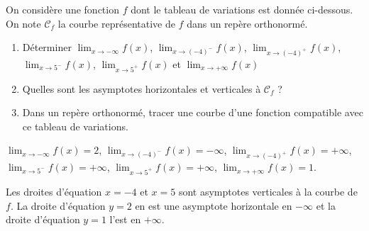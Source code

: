 \documentclass[11pt,fleqn, openany]{book} %
\begin{document}
\begin{exercise}[topic=lim21]On considère une fonction $f$ dont le tableau de variations est donnée ci-dessous. On note $\mathcal{C}_f$ la courbe représentative de $f$ dans un repère orthonormé.

\begin{center}
\end{center}

\begin{enumerate}
\item Déterminer $\displaystyle \lim_{x \to -\infty} f(x)$, $\displaystyle \lim_{x \to (-4)^-} f(x)$, $\displaystyle \lim_{x \to (-4)^+} f(x)$, $\displaystyle \lim_{x \to 5^-} f(x)$, $\displaystyle \lim_{x \to 5^+} f(x)$ et $\displaystyle \lim_{x \to +\infty} f(x)$
\item Quelles sont les asymptotes horizontales et verticales à $\mathcal{C}_f$ ?
\item Dans un repère orthonormé, tracer une courbe d'une fonction compatible avec ce tableau de variations.
\end{enumerate}\end{exercise}

\begin{solution}
 $\displaystyle \lim_{x \to -\infty} f(x)=2$, 
 $\displaystyle \lim_{x \to (-4)^-} f(x)=-\infty$,  $\displaystyle \lim_{x \to (-4)^+} f(x)=+\infty$,  $\displaystyle \lim_{x \to 5^-} f(x)=+\infty$, 
 $\displaystyle \lim_{x \to 5^+} f(x)=+\infty$,
$\displaystyle \lim_{x \to +\infty} f(x)=1$.

Les droites d'équation $x=-4$ et $x=5$ sont asymptotes verticales à la courbe de $f$. La droite d'équation $y=2$ en est une asymptote horizontale en $-\infty$ et la droite d'équation $y=1$ l'est en $+\infty$.


\begin{center}
\end{center}
\newpage
\end{solution}
\end{document}
